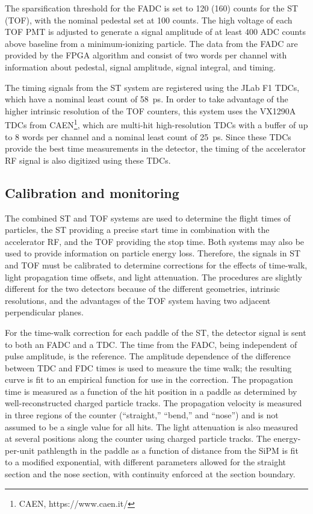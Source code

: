 The sparsification threshold for the FADC is set to 120 (160) counts for the ST (TOF), with the nominal pedestal set at 100 counts. The high voltage of each TOF PMT is adjusted to generate a signal amplitude of at least 400 ADC counts above baseline from a minimum-ionizing particle. The data from the FADC are provided by the FPGA algorithm and consist
of two words per channel with information about pedestal, signal amplitude, signal integral, and timing.

The timing signals from the ST system are registered using the JLab F1 TDCs, which have a nominal least count of 58~ps. In order to take advantage of the higher intrinsic resolution of the TOF counters, this system uses the VX1290A TDCs from CAEN\footnote{CAEN, https://www.caen.it/}, which are multi-hit high-resolution TDCs with a buffer of up to 8 words per channel and a nominal least count of 25~ps. Since these TDCs provide the best time measurements in the \gx{} detector, the timing of the accelerator RF signal is also
digitized using these TDCs.

\subsection{Calibration and monitoring \label{sec:sccalib}}
The combined ST and TOF systems are used to determine the flight times of particles, the ST providing a precise start time in combination with the accelerator RF, and the TOF providing the stop time. Both systems may also be used to provide information on particle energy loss. Therefore, the signals in ST and TOF must be 
calibrated to determine corrections for the effects of
time-walk, light propagation time offsets, and light attenuation. The procedures are slightly different for the two detectors because of the different geometries, intrinsic resolutions, and the advantages of the TOF system having two adjacent perpendicular planes. 

For the time-walk correction for each paddle of the ST, the detector signal is sent to both an FADC and a TDC. The time from the FADC, being independent of pulse amplitude, is the reference. The amplitude dependence of the difference between TDC and FDC times is used to measure the time walk; the resulting curve is fit to an empirical function for use in the correction. 
The propagation time is measured as a function of the hit position in a paddle as determined by well-reconstructed charged particle tracks. The propagation velocity is measured in three regions of the counter (``straight,'' ``bend,'' and ``nose'') and is not assumed to be a single value for all hits. The light attenuation is also measured at several positions along the counter using charged particle tracks. The energy-per-unit pathlength in the paddle as a function of distance from the SiPM is fit to a modified exponential, with different parameters allowed for the straight section and the nose section, with continuity enforced at the section boundary.

